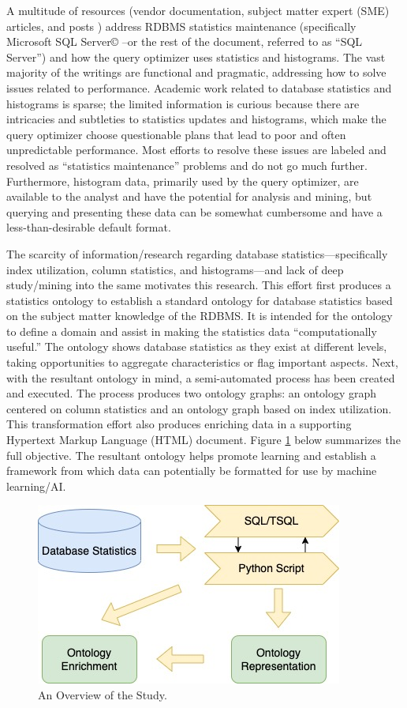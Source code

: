 \documentclass[sigconf]{acmart}
\begin{document}
A multitude of resources (vendor documentation, subject matter expert (SME) articles, and posts \cite{RWesta, RWestb, RWestc}) address RDBMS statistics maintenance (specifically Microsoft SQL Server© --or the rest of the document, referred to as “SQL Server”) and how the query optimizer uses statistics and histograms. The vast majority of the writings are functional and pragmatic, addressing how to solve issues related to performance. Academic work related to database statistics and histograms is sparse; the limited information is curious because there are intricacies and subtleties to statistics updates and histograms, which make the query optimizer choose questionable plans that lead to poor and often unpredictable performance. Most efforts to resolve these issues are labeled and resolved as “statistics maintenance” problems and do not go much further. Furthermore, histogram data, primarily used
by the query optimizer, are available to the analyst and have the potential for analysis and mining, but querying and presenting these data can be somewhat cumbersome and have a less-than-desirable default format.

The scarcity of information/research regarding database statistics—specifically index utilization, column statistics, and histograms—and lack of deep study/mining into the same motivates this research. This effort first produces a statistics ontology to establish a standard ontology for database statistics based on the subject matter knowledge of the RDBMS. It is intended for the ontology to define a domain and assist in making the statistics data “computationally useful.” The ontology shows database statistics as they exist at different levels, taking opportunities to aggregate characteristics or flag important aspects. Next, with the resultant ontology in mind, a semi-automated process has been created and executed. The process produces two ontology graphs: an ontology graph centered on column statistics and an ontology graph based on index utilization. This transformation effort also produces enriching data in a supporting Hypertext Markup Language (HTML) document. Figure \ref{overview} below summarizes the full objective. The resultant ontology helps promote learning and establish a framework from which data can potentially be formatted for use by machine learning/AI.

\begin{figure}[h]
	\centering
	\includegraphics[width=0.8\linewidth]{db-statistics-ontology}
	\caption{An Overview of the Study.}
	\label{overview}
\end{figure}
\end{document}
